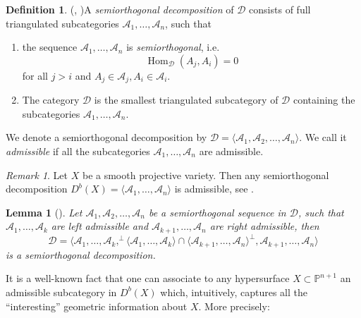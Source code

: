 \documentclass[a4paper, twoside, 11pt]{amsart}
\newtheorem{lemma}[theorem]{Lemma}
\theoremstyle{definition}
\newtheorem{definition}[theorem]{Definition}
\theoremstyle{remark}
\newtheorem{remark}[theorem]{Remark}
\numberwithin{equation}{theorem}
\DeclareMathOperator{\Hom}{Hom}
\newcommand{\dbx}{D^b(X)}
\begin{document}
\begin{definition}(\cite{BK_rep_funcots_serre_func}, \cite{Bondal_Orlov_SOD})\label{SOD_def}
	A \textit{semiorthogonal decomposition} of $\mathcal{D}$ consists of full triangulated subcategories $\mathcal{A}_1, \dots, \mathcal{A}_n$, such that 
	\begin{enumerate}
		\item the sequence $\mathcal{A}_1, \dots, \mathcal{A}_n$ is \textit{semiorthogonal}, i.e.\,
		\begin{equation*}
			\Hom_{\mathcal{D}}(A_j, A_i) = 0
		\end{equation*} 
		for all $j >i$ and $A_j\in \mathcal{A}_j,A_i \in \mathcal{A}_i$.
		\item The category $\mathcal{D}$ is the smallest triangulated subcategory of $\mathcal{D}$ containing the subcategories $\mathcal{A}_1, \dots, \mathcal{A}_n$.
	\end{enumerate}
We denote a semiorthogonal decomposition by $\mathcal{D} = \langle \mathcal{A}_1, \mathcal{A}_2, \dots, \mathcal{A}_n \rangle$. We call it \textit{admissible} if all the subcategories $\mathcal{A}_1, \dots, \mathcal{A}_n$ are admissible. 
\begin{remark}\label{admissible_if_sm}
	Let $X$ be a smooth projective variety. Then any semiorthogonal decomposition 
	$\dbx= \langle \mathcal{A}_1, \dots, \mathcal{A}_n \rangle$ is admissible, see \cite{BK_rep_funcots_serre_func}.
\end{remark}
\end{definition}
\begin{lemma}[{\cite[Lemma 3.1]{Bondal_ass_alg_coh}}]\label{SOD}
	Let $\mathcal{A}_1, \mathcal{A}_2, \dots, \mathcal{A}_n$ be a semiorthogonal sequence in $\mathcal{D}$, such that $\mathcal{A}_1, \dots, \mathcal{A}_k$ are \textit{left admissible} and $\mathcal{A}_{k+1}, \dots, \mathcal{A}_n$ are \textit{right admissible}, then 
	\begin{equation*}
		\mathcal{D} = \langle \mathcal{A}_1, \dots, \mathcal{A}_k, ^\bot\langle \mathcal{A}_1, \dots, \mathcal{A}_k \rangle \cap \langle \mathcal{A}_{k+1}, \dots, \mathcal{A}_n \rangle^\bot, \mathcal{A}_{k+1}, \dots, \mathcal{A}_n \rangle
	\end{equation*}
is a semiorthogonal decomposition.
\end{lemma}
It is a well-known fact that one can associate to 
any hypersurface $X \subset \mathbb{P}^{n+1}$ an admissible subcategory in $D^b(X)$ which, intuitively, captures all the ``interesting'' geometric information about $X$. More precisely:
\end{document}
